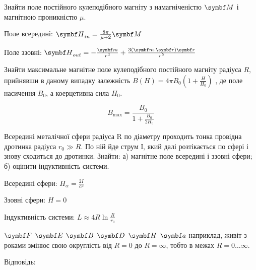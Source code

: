 \documentclass[]{ProblemBook}
\begin{document}
\begin{problem}
Знайти поле постійного кулеподібного магніту з намагніченістю $\vect{M}$ і магнітною проникністю $\mu$.    
	\begin{solution}

Поле всередині:  ${\Hfield}_{in} = \frac{8\pi}{\mu + 2}\vect{M}$

Поле ззовні: ${\Hfield}_{out} =  - \frac{\vect{m}}{r^3} + \frac{3\left( {\vect{m}\cdot\vect{r}} \right)\vect{r}}{r^5}$
	 
\end{solution}
\end{problem}

\begin{problem}
Знайти максимальне магнітне поле кулеподібного постійного магніту радіуса $R$, прийнявши в даному випадку залежність $B\left(H\right)= 4\pi B_0 \left(1+\frac{H}{H_0}\right)$  , де поле насичення $B_0$, а коерцетивна сила $H_0$.
	\begin{solution}
\[B_{\max} = \frac{B_0}{1 + \frac{B_0}{2H_0}}\]	
\end{solution}
\end{problem}

\begin{problem}
Всередині металічної сфери радіуса R по діаметру проходить тонка провідна дротинка радіуса $r_0 \gg R$. По ній йде струм І, який далі розтікається по сфері і знову сходиться до дротинки. Знайти: а) магнітне поле всередині і ззовні сфери; б) оцінити індуктивність системи. 
	\begin{solution}

Всередині сфери: $H_\alpha = \frac{2I}{cr}$

Ззовні сфери: $H =0$

Індуктивність системи: $L \approx 4R\ln \frac{R}{r_0}$	
\end{solution}
\end{problem}


\begin{problem}
    $\vect{F}$
$\Efield$
$\Bfield$
$\Dfield$
$\Hfield$
$\vect{a}$
наприклад, живіт з роками змінює свою округлість від $R = 0$ до $R = \infty$, тобто в межах $R = 0 \ldots \infty$.
	\begin{solution}
	Відповідь: 
\end{solution}
\end{problem}

\begin{problem}
 
	\begin{solution}
	
\end{solution}
\end{problem}
\end{document}
